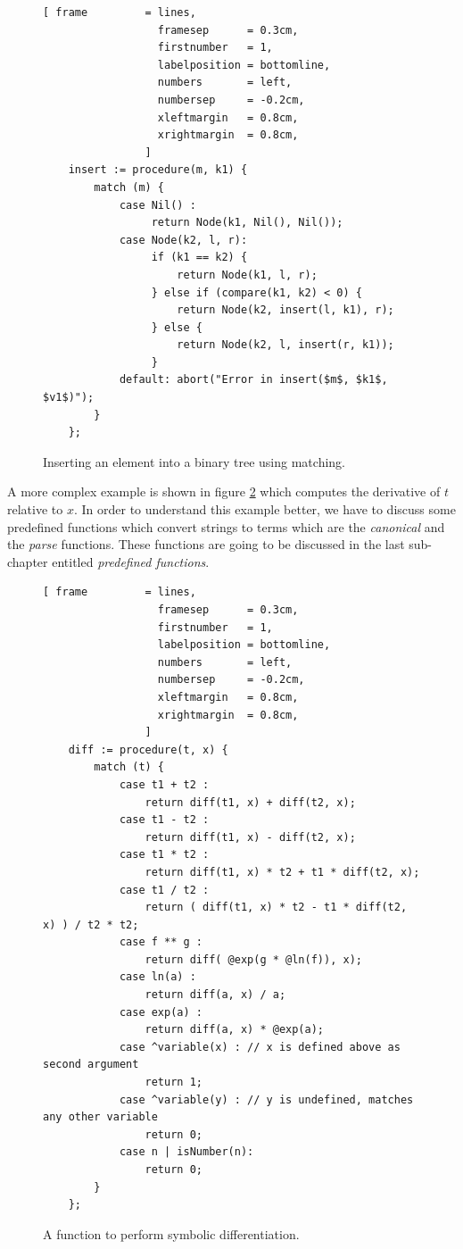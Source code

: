 \documentclass[11pt]{article}
\begin{document}
\begin{figure}[!ht]
\centering
\begin{Verbatim}[ frame         = lines, 
                  framesep      = 0.3cm, 
                  firstnumber   = 1,
                  labelposition = bottomline,
                  numbers       = left,
                  numbersep     = -0.2cm,
                  xleftmargin   = 0.8cm,
                  xrightmargin  = 0.8cm,
                ]
    insert := procedure(m, k1) {
        match (m) {
            case Nil() : 
                 return Node(k1, Nil(), Nil());
            case Node(k2, l, r): 
                 if (k1 == k2) {
                     return Node(k1, l, r);
                 } else if (compare(k1, k2) < 0) { 
                     return Node(k2, insert(l, k1), r);
                 } else {
                     return Node(k2, l, insert(r, k1));
                 }
            default: abort("Error in insert($m$, $k1$, $v1$)");
        }
    };
\end{Verbatim}
\vspace*{-0.3cm}
\caption{Inserting an element into a binary tree using matching.}
\label{fig:binary-tree.stlx}
\end{figure}

A more complex example is shown in figure \ref{fig:diff.stlx} which computes the derivative of $t$ relative to $x$. In order to understand this example better, we have to discuss some predefined functions which convert strings to terms which are the \textsl{canonical} and the \textsl{parse} functions. These functions are going to be discussed in the last sub-chapter entitled \textsl{predefined functions}.

\begin{figure}[!ht]
\centering
\begin{Verbatim}[ frame         = lines, 
                  framesep      = 0.3cm, 
                  firstnumber   = 1,
                  labelposition = bottomline,
                  numbers       = left,
                  numbersep     = -0.2cm,
                  xleftmargin   = 0.8cm,
                  xrightmargin  = 0.8cm,
                ]
    diff := procedure(t, x) {
        match (t) {
            case t1 + t2 :
                return diff(t1, x) + diff(t2, x);
            case t1 - t2 :
                return diff(t1, x) - diff(t2, x);
            case t1 * t2 :
                return diff(t1, x) * t2 + t1 * diff(t2, x);
            case t1 / t2 :
                return ( diff(t1, x) * t2 - t1 * diff(t2, x) ) / t2 * t2;
            case f ** g :
                return diff( @exp(g * @ln(f)), x);
            case ln(a) :
                return diff(a, x) / a;
            case exp(a) :
                return diff(a, x) * @exp(a);
            case ^variable(x) : // x is defined above as second argument
                return 1;
            case ^variable(y) : // y is undefined, matches any other variable
                return 0;
            case n | isNumber(n):   
                return 0;  
        }
    };
\end{Verbatim}
\vspace*{-0.3cm}
\caption{A function to perform symbolic differentiation.}
\label{fig:diff.stlx}
\end{figure}
\end{document}
